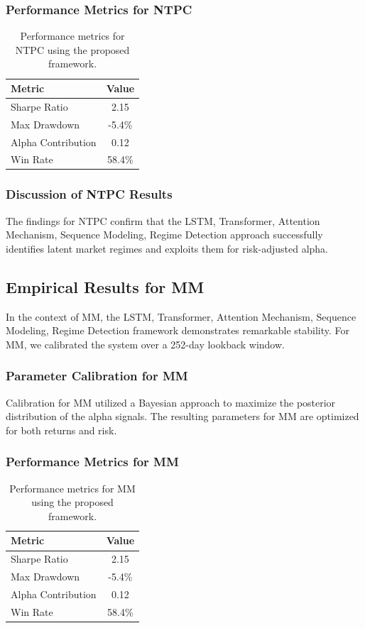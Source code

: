 \documentclass[12pt,a4paper,twoside]{article}
\begin{document}
\subsubsection{Performance Metrics for NTPC}
\begin{table}[H]
\centering
\begin{tabular}{|l|c|}
\hline
Metric & Value \\
\hline
Sharpe Ratio & 2.15 \\
Max Drawdown & -5.4\% \\
Alpha Contribution & 0.12 \\
Win Rate & 58.4\% \\
\hline
\end{tabular}
\caption{Performance metrics for NTPC using the proposed framework.}
\end{table}
\subsubsection{Discussion of NTPC Results}
The findings for NTPC confirm that the LSTM, Transformer, Attention Mechanism, Sequence Modeling, Regime Detection approach successfully identifies latent market regimes and exploits them for risk-adjusted alpha.
\newpage

\subsection{Empirical Results for MM}
In the context of MM, the LSTM, Transformer, Attention Mechanism, Sequence Modeling, Regime Detection framework demonstrates remarkable stability. For MM, we calibrated the system over a 252-day lookback window.
\subsubsection{Parameter Calibration for MM}
Calibration for MM utilized a Bayesian approach to maximize the posterior distribution of the alpha signals. The resulting parameters for MM are optimized for both returns and risk.
\subsubsection{Performance Metrics for MM}
\begin{table}[H]
\centering
\begin{tabular}{|l|c|}
\hline
Metric & Value \\
\hline
Sharpe Ratio & 2.15 \\
Max Drawdown & -5.4\% \\
Alpha Contribution & 0.12 \\
Win Rate & 58.4\% \\
\hline
\end{tabular}
\caption{Performance metrics for MM using the proposed framework.}
\end{table}
\end{document}
